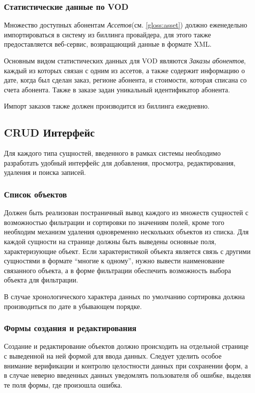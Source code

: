 \subsubsection{Статистические данные по VOD}
\label{stat:vod}
Множество доступных абонентам \textit{Ассетов}(см. \ref{gloss:asset}) должно еженедельно импортироваться в систему из 
биллинга провайдера, для этого также предоставляется веб-сервис, возвращающий данные в формате XML.

Основным видом статистических данных для VOD являются \textit{Заказы абонентов}, каждый из которых связан с одним из ассетов,
а также содержит информацию о дате, когда был сделан заказ, регионе абонента, и стоимости, которая списана со счета абонента.
Также в заказе задан уникальный идентификатор абонента.

Импорт заказов также должен производится из биллинга ежедневно.

\subsection{CRUD Интерфейс} 
Для каждого типа сущностей, введенного в рамках системы необходимо разработать удобный интерфейс для добавления, 
просмотра, редактирования, удаления и поиска записей.

\subsubsection{Список объектов}
\label{crud:list}
Должен быть реализован постраничный вывод каждого из множеств сущностей с возможностью фильтрации и сортировки
по значениям полей, кроме того необходим механизм удаления одновременно нескольких объектов из списка.
Для каждой сущности на странице должны быть выведены основные поля, характеризующие объект.
Если характеристикой объекта является связь с другими сущностями в формате ``многие к одному'',
нужно вывести наименование связанного объекта, а в форме фильтрации обеспечить возможность выбора объекта
для фильтрации. 

В случае хронологического характера данных по умолчанию сортировка должна производиться по дате в убывающем порядке.

\subsubsection{Формы создания и редактирования}
\label{crud:forms}
Создание и редактирование объектов должно происходить на отдельной странице с выведенной на ней формой для ввода данных.
Следует уделить особое внимание верификации и контролю целостности данных при сохранении форм, а в случае неверно
введенных данных уведомлять пользователя об ошибке, выделяя те поля формы, где произошла ошибка.

